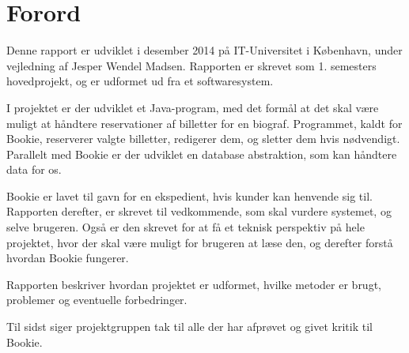 \chapter{Forord}


Denne rapport er udviklet i desember 2014 på IT-Universitet i København,  under vejledning af Jesper Wendel Madsen. Rapporten er skrevet som 1. semesters hovedprojekt, og er udformet ud fra et softwaresystem.

I projektet er der udviklet et Java-program, med det formål at det skal være muligt at håndtere reservationer af billetter for en biograf. Programmet, kaldt for Bookie, reserverer valgte billetter, redigerer dem, og sletter dem hvis nødvendigt. Parallelt med Bookie er der udviklet en database abstraktion, som kan håndtere data for os.

Bookie er lavet til gavn for en ekspedient, hvis kunder kan henvende sig til. Rapporten derefter, er skrevet til vedkommende, som skal vurdere systemet, og selve brugeren. Også er den skrevet for at få et teknisk perspektiv på hele projektet, hvor der skal være muligt for brugeren at læse den, og derefter forstå hvordan Bookie fungerer.

Rapporten beskriver hvordan projektet er udformet, hvilke metoder er brugt, problemer og eventuelle forbedringer.

Til sidst siger projektgruppen tak til alle der har afprøvet og givet kritik til Bookie.





